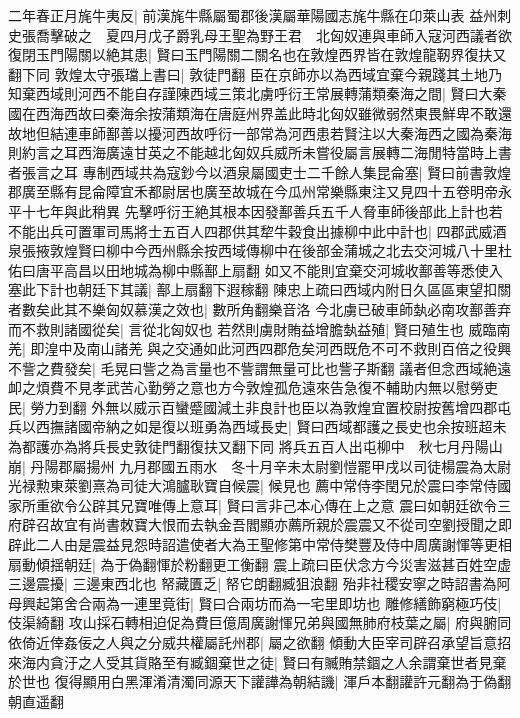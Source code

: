 二年春正月旄牛夷反|{
	前漢旄牛縣屬蜀郡後漢屬華陽國志旄牛縣在卬萊山表}
益州刺史張喬擊破之　夏四月戊子爵乳母王聖為野王君　北匈奴連與車師入寇河西議者欲復閉玉門陽關以絶其患|{
	賢曰玉門陽關二關名也在敦煌西界皆在敦煌龍靭界復扶又翻下同}
敦煌太守張璫上書曰|{
	敦徒門翻}
臣在京師亦以為西域宜棄今親踐其土地乃知棄西域則河西不能自存謹陳西域三策北虜呼衍王常展轉蒲類秦海之間|{
	賢曰大秦國在西海西故曰秦海余按蒲類海在唐庭州界盖此時北匈奴雖微弱然東畏鮮卑不敢還故地但結連車師鄯善以擾河西故呼衍一部常為河西患若賢注以大秦海西之國為秦海則約言之耳西海廣遠甘英之不能越北匈奴兵威所未嘗役屬言展轉二海閒特當時上書者張言之耳}
專制西域共為寇鈔今以酒泉屬國吏士二千餘人集昆侖塞|{
	賢曰前書敦煌郡廣至縣有昆侖障宜禾都尉居也廣至故城在今瓜州常樂縣東注又見四十五卷明帝永平十七年與此稍異}
先擊呼衍王絶其根本因發鄯善兵五千人脅車師後部此上計也若不能出兵可置軍司馬將士五百人四郡供其犂牛穀食出據柳中此中計也|{
	四郡武威酒泉張掖敦煌賢曰柳中今西州縣余按西域傳柳中在後部金蒲城之北去交河城八十里杜佑曰唐平高昌以田地城為柳中縣鄯上扇翻}
如又不能則宜棄交河城收鄯善等悉使入塞此下計也朝廷下其議|{
	鄯上扇翻下遐稼翻}
陳忠上疏曰西域内附日久區區東望扣關者數矣此其不樂匈奴慕漢之效也|{
	數所角翻樂音洛}
今北虜已破車師埶必南攻鄯善弃而不救則諸國從矣|{
	言從北匈奴也}
若然則虜財賄益增膽埶益殖|{
	賢曰殖生也}
威臨南羌|{
	即湟中及南山諸羌}
與之交通如此河西四郡危矣河西既危不可不救則百倍之役興不訾之費發矣|{
	毛晃曰訾之為言量也不訾謂無量可比也訾子斯翻}
議者但念西域絶遠卹之煩費不見孝武苦心勤勞之意也方今敦煌孤危遠來告急復不輔助内無以慰勞吏民|{
	勞力到翻}
外無以威示百蠻蹙國減土非良計也臣以為敦煌宜置校尉按舊增四郡屯兵以西撫諸國帝納之如是復以班勇為西域長史|{
	賢曰西域都護之長史也余按班超未為都護亦為將兵長史敦徒門翻復扶又翻下同}
將兵五百人出屯柳中　秋七月丹陽山崩|{
	丹陽郡屬揚州}
九月郡國五雨水　冬十月辛未太尉劉愷罷甲戌以司徒楊震為太尉光禄勲東萊劉熹為司徒大鴻臚耿寶自候震|{
	候見也}
薦中常侍李閏兄於震曰李常侍國家所重欲令公辟其兄寶唯傳上意耳|{
	賢曰言非己本心傳在上之意}
震曰如朝廷欲令三府辟召故宜有尚書敇寶大恨而去執金吾閻顯亦薦所親於震震又不從司空劉授聞之即辟此二人由是震益見怨時詔遣使者大為王聖修第中常侍樊豐及侍中周廣謝惲等更相扇動傾揺朝廷|{
	為于偽翻惲於粉翻更工衡翻}
震上疏曰臣伏念方今災害滋甚百姓空虚三邊震擾|{
	三邊東西北也}
帑藏匱乏|{
	帑它朗翻臧狙浪翻}
殆非社稷安寧之時詔書為阿母興起第舍合兩為一連里竟街|{
	賢曰合兩坊而為一宅里即坊也}
雕修繕飾窮極巧伎|{
	伎渠綺翻}
攻山採石轉相迫促為費巨億周廣謝惲兄弟與國無肺府枝葉之屬|{
	府與腑同}
依倚近倖姦佞之人與之分威共權屬託州郡|{
	屬之欲翻}
傾動大臣宰司辟召承望旨意招來海内貪汙之人受其貨賂至有臧錮棄世之徒|{
	賢曰有贓賄禁錮之人余謂棄世者見棄於世也}
復得顯用白黑渾淆清濁同源天下讙譁為朝結譏|{
	渾戶本翻讙許元翻為于偽翻朝直遥翻}
